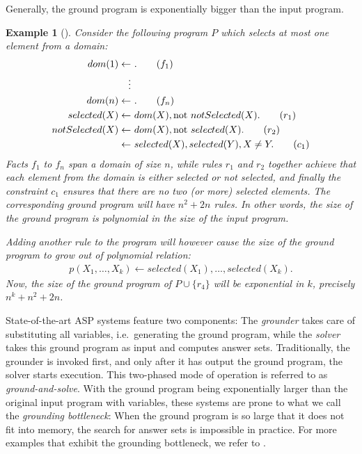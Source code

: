 \documentclass{vutinfth} %
\newtheorem{example}{Example}[section]
\newcommand{\fail}{\mathrm{not } \ \xspace}
\newcommand{\from}{\ensuremath{\leftarrow}}
\begin{document}
Generally, the ground program is exponentially bigger than the input program.

\newpage

\begin{example}[{\cite[Example 1]{alpha-techniques}}]
\label{ex:explosion}
Consider the following program $P$ which selects at most one element from a domain:
\begin{align}
dom(1) \from& \ .\tag{$f_1$} \\
\vdots \notag \\
dom(n) \from& \ . \tag{$f_n$} \\
selected(X) \from& \  dom(X), \fail notSelected(X).  \tag{$r_1$} \\
notSelected(X) \from& \  dom(X), \fail selected(X).  \tag{$r_2$} \\
\from& \ selected(X), selected(Y), X \not = Y.  \tag{$c_1$}
\end{align}
Facts $f_1$ to $f_n$ span a domain of size $n$, while rules $r_1$ and $r_2$ together achieve that each element from the domain is either selected or not selected, and finally the constraint $c_1$ ensures that there are no two (or more) selected elements. The corresponding ground program will have $n^2 + 2n$ rules. In other words, the size of the ground program is polynomial in the size of the input program.

Adding another rule to the program will however cause the size of the ground program to grow out of polynomial relation:
\begin{align}p(X_1, \ldots, X_k) \from selected(X_1), \ldots, selected(X_k). \tag{$r_3$} \end{align}
Now, the size of the ground program of $P \cup \{ r_4 \}$ will be exponential in $k$, precisely $n^k + n^2 + 2n$.
\end{example}

State-of-the-art ASP systems feature two components: The \emph{grounder} takes care of substituting all variables, i.e.~generating the ground program, while the \emph{solver} takes this ground program as input and computes answer sets. Traditionally, the grounder is invoked first, and only after it has output the ground program, the solver starts execution. This two-phased mode of operation is referred to as \emph{ground-and-solve}. With the ground program being exponentially larger than the original input program with variables, these systems are prone to what we call the \emph{grounding bottleneck}: When the ground program is so large that it does not fit into memory, the search for answer sets is impossible in practice. For more examples that exhibit the grounding bottleneck, we refer to \cite[Section 1]{asperix}.
\end{document}
